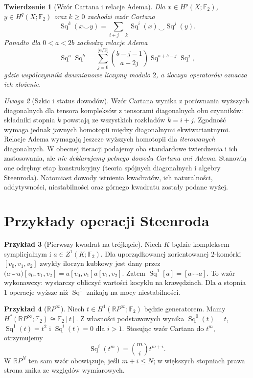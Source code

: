 \documentclass[11pt,a4paper,oneside]{report}
\newcommand{\F}{\mathbb{F}}
\newcommand{\R}{\mathbb{R}}
\theoremstyle{plain}
\newtheorem{twierdzenie}{Twierdzenie}[section]
\theoremstyle{definition}
\newtheorem{przyklad}[twierdzenie]{Przykład}
\theoremstyle{remark}
\newtheorem{uwaga}[twierdzenie]{Uwaga}
\begin{document}
\begin{twierdzenie}[Wzór Cartana i relacje Adema]
\label{thm:steenrod-cartan-v7}
Dla $x\in H^p(X;\F_2)$, $y\in H^q(X;\F_2)$
oraz $k\ge0$ zachodzi \emph{wzór Cartana}
\[
\operatorname{Sq}^k(x\smile y)=
\sum_{i+j=k}\operatorname{Sq}^i(x)\smile\operatorname{Sq}^j(y).
\]
Ponadto dla $0<a<2b$ zachodzą \emph{relacje Adema}
\[
\operatorname{Sq}^a\operatorname{Sq}^b
=\sum_{j=0}^{\lfloor a/2\rfloor}
\binom{b-j-1}{a-2j}\operatorname{Sq}^{a+b-j}\operatorname{Sq}^j,
\]
gdzie współczynniki dwumianowe liczymy modulo $2$,
a iloczyn operatorów oznacza ich złożenie.
\end{twierdzenie}
\begin{uwaga}[Szkic i status dowodów]
Wzór Cartana wynika z porównania wyższych diagonalnych
dla tensora kompleksów z tensorami diagonalnych
obu czynników: składniki stopnia $k$ powstają ze
wszystkich rozkładów $k=i+j$. Zgodność wymaga jednak
jawnych homotopii między diagonalnymi ekwiwariantnymi.
Relacje Adema wymagają jeszcze wyższych homotopii
dla \emph{iterowanych} diagonalnych. W obecnej iteracji
podajemy oba standardowe twierdzenia i ich zastosowania,
ale \emph{nie deklarujemy pełnego dowodu Cartana ani
Adema}. Stanowią one odrębny etap konstrukcyjny
(teoria spójnych diagonalnych i algebry Steenroda).
Natomiast dowody istnienia kwadratów, ich naturalności,
addytywności, niestabilności oraz górnego kwadratu
zostały podane wyżej.
\end{uwaga}

\section{Przykłady operacji Steenroda}

\begin{przyklad}[Pierwszy kwadrat na trójkącie]
Niech $K$ będzie kompleksem symplicjalnym i
$a\in Z^1(K;\F_2)$. Dla uporządkowanej
zorientowanej $2$-komórki $[v_0,v_1,v_2]$
zwykły iloczyn kubkowy jest dany przez
$\bigl(a\smile a\bigr)[v_0,v_1,v_2]
=a[v_0,v_1]a[v_1,v_2]$. Zatem
$\operatorname{Sq}^1[a]=[a\smile a]$.
To wzór wykonawczy: wystarczy obliczyć wartości
kocyklu na krawędziach. Dla $a$ stopnia $1$
operacje wyższe niż $\operatorname{Sq}^1$ znikają
na mocy niestabilności.
\end{przyklad}

\begin{przyklad}[\texorpdfstring{$\R P^\infty$}{RP infinity}]
Niech $t\in H^1(\R P^\infty;\F_2)$ będzie generatorem.
Mamy $H^*(\R P^\infty;\F_2)\cong\F_2[t]$.
Z własności podstawowych wynika
$\operatorname{Sq}^0(t)=t$,
$\operatorname{Sq}^1(t)=t^2$ i
$\operatorname{Sq}^i(t)=0$ dla $i>1$.
Stosując wzór Cartana do $t^m$, otrzymujemy
\[
\operatorname{Sq}^i(t^m)=\binom mi t^{m+i}.
\]
W $\R P^N$ ten sam wzór obowiązuje, jeśli
$m+i\le N$; w większych stopniach prawa strona
znika ze względów wymiarowych.
\end{przyklad}
\end{document}
